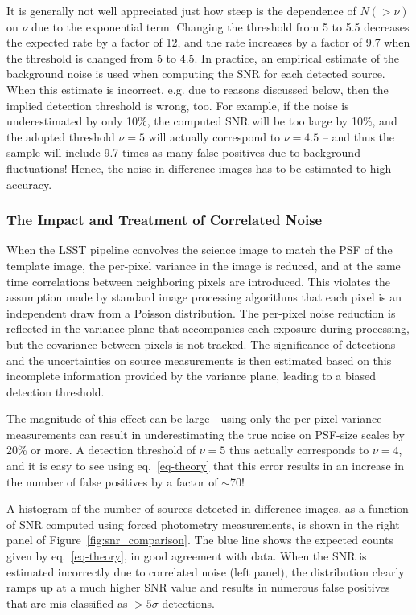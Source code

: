It is generally not well appreciated just how steep is the dependence of $N(>\nu)$
on $\nu$ due to the exponential term. Changing the threshold from 5 to 5.5
decreases the expected rate by a factor of 12, and the rate increases by a factor
of 9.7 when the threshold is changed from 5 to 4.5. In practice, an empirical estimate
of the background noise is used when computing the SNR for each detected source.
When this estimate is incorrect, e.g. due to reasons discussed below, then the
implied detection threshold is wrong, too. For example, if the noise is underestimated
by only 10\%, the computed SNR will be too large by 10\%, and the adopted
threshold $\nu=5$ will actually correspond to $\nu=4.5$ -- and thus the
sample will include 9.7 times as many false positives due to background
fluctuations! Hence, the noise in difference images has to be estimated to
high accuracy.


\subsubsection{The Impact and Treatment of Correlated Noise}

When the LSST pipeline convolves the science image to match the PSF of the template
image, the per-pixel variance in the image is reduced, and at the same
time correlations between neighboring pixels are introduced. This violates the
assumption made by standard image processing algorithms that each pixel is an
independent draw from a Poisson distribution. The per-pixel noise reduction is
reflected in the variance plane that accompanies each exposure during
processing, but the covariance between pixels is not tracked.
The significance of detections and the uncertainties on source measurements is
then estimated based on this incomplete information provided by the variance
plane, leading to a biased detection threshold.

The magnitude of this effect can be large---using only the per-pixel variance
measurements can result in underestimating the true noise on PSF-size scales by
20\% or more. A detection threshold of $\nu=5$ thus actually corresponds to
$\nu=4$, and it is easy to see using eq.~\ref{eq-theory} that this error results
in an increase in the number of false positives by a factor of $\sim$70!

A histogram of the number of sources detected in difference images, as a function
of SNR computed using forced photometry measurements, is shown in the right panel
of Figure~\ref{fig:snr_comparison}. The blue line shows the expected counts given
by eq.~\ref{eq-theory}, in good agreement with data. When the SNR is estimated
incorrectly due to correlated noise (left panel), the distribution clearly ramps
up at a much higher SNR value and results in numerous false positives that are
mis-classified as $>5 \sigma$ detections.

